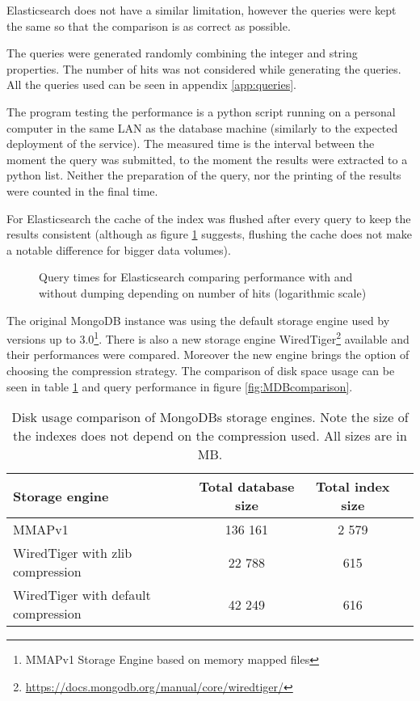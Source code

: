 Elasticsearch does not have a similar limitation, however the queries were kept
the same so that the comparison is as correct as possible.

The queries were generated randomly combining the integer and string properties. The number of hits was not 
considered while generating the queries. All the queries used can be seen in appendix \ref{app:queries}.

The program testing the performance is a python script running on a personal computer in the same LAN as the 
database machine (similarly to the expected deployment of the service). The measured time is the interval between 
the moment the query was submitted, to the moment the results were extracted to a python list. Neither the 
preparation of the query, nor the printing of the results were counted in the final time. 

For Elasticsearch the cache of the index was flushed after every query to keep the results consistent (although as 
figure \ref{fig:EScache} suggests, flushing the cache does not make a notable difference for bigger data volumes). 

\begin{figure}[h]
	\centering
	
	\caption{Query times for Elasticsearch comparing performance with and without dumping depending on number of 
	hits (logarithmic scale)}
	\label{fig:EScache}
\end{figure}
\pagebreak
The original MongoDB instance was using the default storage engine used by versions up to 3.0\footnote{MMAPv1 
Storage Engine based on memory mapped files}. There is also a new storage engine WiredTiger\footnote{
\url{https://docs.mongodb.org/manual/core/wiredtiger/}} available and their performances were compared.
Moreover the new engine brings the option of choosing the compression strategy. The comparison of disk space usage 
can be seen in table \ref{tab:MongoComp} and query performance in figure \ref{fig:MDBcomparison}.

\begin{table}[h]
\centering
\begin{tabular}{lccc}
\toprule
\textbf{Storage engine}             & \textbf{Total database size} & \textbf{Total index size} \\ 
\midrule
MMAPv1                              & 136 161                      & 2 579 \\ 
WiredTiger with zlib compression    & 22 788                       & 615   \\ 
WiredTiger with default compression & 42 249                       & 616   \\ 
\toprule
\end{tabular}
\caption{Disk usage comparison of MongoDBs storage engines. Note the size of the indexes does not depend on the
compression used. All sizes are in MB.}
\label{tab:MongoComp}
\end{table}

